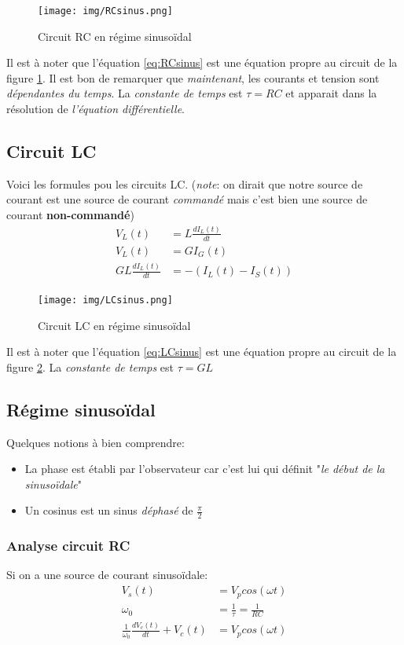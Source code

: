 \documentclass{report}
\begin{document}
\begin{figure}[H]
\centering
\texttt{[image: img/RCsinus.png]} \label{img:RCsinus}
\caption{Circuit RC en régime sinusoïdal}
\end{figure}

Il est à noter que l'équation \ref{eq:RCsinus} est une équation propre au circuit de la figure \ref{img:RCsinus}. Il est bon de remarquer que \textit{maintenant}, les courants et tension sont \textit{dépendantes du temps}. La \textit{constante de temps} est $\tau = RC$ et apparait dans la résolution de \textit{l'équation différentielle}.

\subsection{Circuit LC}
Voici les formules pou les circuits LC. (\textit{note}: on dirait que notre source de courant est une source de courant \textit{commandé} mais c'est bien une source de courant \textbf{non-commandé})
\begin{align}
V_L(t) &= L \frac{dI_L(t)}{dt}\\
V_L(t) &= GI_G(t)\\
GL \frac{dI_L(t)}{dt} &= -(I_L(t)-I_S(t))\label{eq:LCsinus}
\end{align}

\begin{figure}[H]
\centering
\texttt{[image: img/LCsinus.png]} \label{img:LCsinus}
\caption{Circuit LC en régime sinusoïdal}
\end{figure}

Il est à noter que l'équation \ref{eq:LCsinus} est une équation propre au circuit de la figure \ref{img:LCsinus}. La \textit{constante de temps} est $\tau = GL$

\subsection{Régime sinusoïdal}
Quelques notions à bien comprendre:
\begin{itemize}
\item La phase est établi par l'observateur car c'est lui qui définit "\textit{le début de la sinusoïdale}"
\item Un cosinus est un sinus \textit{déphasé} de $\frac{\pi}{2}$
\end{itemize}

\subsubsection{Analyse circuit RC}
Si on a une source de courant sinusoïdale:
\begin{align}
V_s(t) &= V_p cos(\omega t)\\
\omega_0 &= \frac{1}{\tau} = \frac{1}{RC}\\
\frac{1}{\omega_0}\frac{dV_c(t)}{dt} + V_c(t) &= V_p cos(\omega t) \label{eq:RCdiff}
\end{align}
\end{document}
